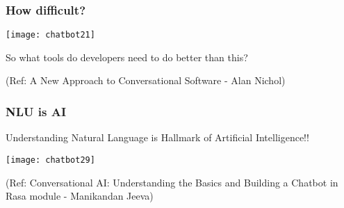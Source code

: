 
 \begin{frame}[fragile]\frametitle{How difficult?}

\begin{center}
\texttt{[image: chatbot21]}

\end{center}

So what tools do developers need to do better than this?


{\tiny (Ref: A New Approach to Conversational Software - Alan Nichol)}
\end{frame}

\begin{frame}[fragile]\frametitle{NLU is AI}

Understanding Natural Language is Hallmark of Artificial Intelligence!!

\begin{center}
\texttt{[image: chatbot29]}
\end{center}

{\tiny (Ref: Conversational AI: Understanding the Basics and Building a Chatbot in Rasa module - Manikandan Jeeva)}
\end{frame}







